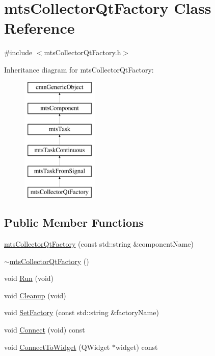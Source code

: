 \hypertarget{classmts_collector_qt_factory}{\section{mts\-Collector\-Qt\-Factory Class Reference}
\label{classmts_collector_qt_factory}
}


{\ttfamily \#include $<$mts\-Collector\-Qt\-Factory.\-h$>$}

Inheritance diagram for mts\-Collector\-Qt\-Factory\-:\begin{figure}[H]
\begin{center}
\leavevmode
\includegraphics[height=6.000000cm]{d7/d73/classmts_collector_qt_factory}
\end{center}
\end{figure}
\subsection*{Public Member Functions}
\begin{DoxyCompactItemize}
\item 
\hyperlink{classmts_collector_qt_factory_ae0c1eb266b29270bcfa9bde5dcbe2cdb}{mts\-Collector\-Qt\-Factory} (const std\-::string \&component\-Name)
\item 
\hyperlink{classmts_collector_qt_factory_a5358bcfb3cefb2a1fbb40ea9d7675ff7}{$\sim$mts\-Collector\-Qt\-Factory} ()
\item 
void \hyperlink{classmts_collector_qt_factory_a643e420653f8996f700acf0e1aa5d214}{Run} (void)
\item 
void \hyperlink{classmts_collector_qt_factory_a557399d603b951f78c8cda6910a69e6f}{Cleanup} (void)
\item 
void \hyperlink{classmts_collector_qt_factory_afd20dbeacf3c0c0e83f52e5b1999320b}{Set\-Factory} (const std\-::string \&factory\-Name)
\item 
void \hyperlink{classmts_collector_qt_factory_ad89a2b9e6f46617187ad486f7938020f}{Connect} (void) const 
\item 
void \hyperlink{classmts_collector_qt_factory_a566330d90cd9b942415c803f70948a0b}{Connect\-To\-Widget} (Q\-Widget $\ast$widget) const 
\end{DoxyCompactItemize}
